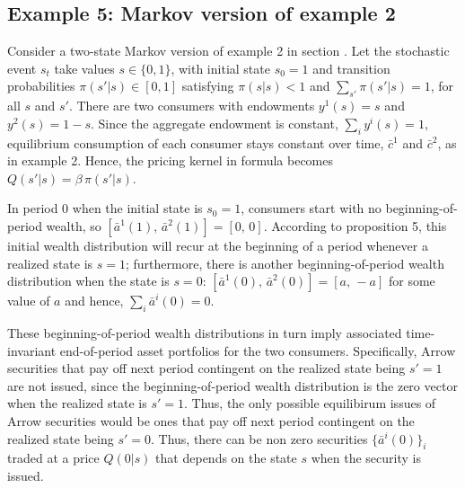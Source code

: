 \subsection{Example 5: Markov version of 
                           example 2}\label{sec:example5}%
Consider a two-state Markov version of example 2 in 
section .
Let the stochastic event $s_t$ take values 
$s\in\{0,1\}$, 
with initial state $s_0=1$ and transition 
probabilities $\pi(s'\vert s)\in [0,1]$
satisfying $\pi(s|s)<1$ and $\sum_{s'} \pi(s'\vert s)=1$,
for all $s$ and $s'$.
There are two consumers with endowments $y^1(s)=s$ and 
$y^2(s)=1-s$. Since the aggregate endowment is constant,
$\sum_i y^i(s)=1$, equilibrium consumption of each
consumer stays constant over time, 
$\bar c^1$ and $\bar c^2$, as in example 2. Hence, 
the pricing kernel in formula  becomes
$Q(s'|s) = \beta \,\pi(s'|s)$.

In period 0 when the initial state is $s_0=1$,  
consumers start with no beginning-of-period wealth, so 
$[\bar a^1(1),\, \bar a^2(1)] = [0,\, 0]$.
According to proposition 5, this initial wealth
distribution will recur  at the beginning of
a period whenever a realized state is $s=1$;  furthermore, 
there is another beginning-of-period wealth
distribution when the state is $s=0$:
$[\bar a^1(0),\, \bar a^2(0)] = [a,\, -\!a]$ 
for some value of $a$ and hence,
$\sum_{i} \bar a^i(0) =0$.

These beginning-of-period wealth distributions in
turn imply associated time-invariant end-of-period 
asset portfolios for  the two consumers. 
Specifically,  Arrow
securities that pay off next period contingent on 
the realized state being $s'=1$ are not  issued, since the 
beginning-of-period wealth distribution is the 
zero vector when the realized state is $s'=1$.
Thus, the only possible equilibirum issues of Arrow
securities would be ones that pay off next period
contingent on the realized state being $s'=0$. Thus, there can be non zero
securities $\{\bar a^i(0)\}_i$ traded  at a price 
$Q(0 | s)$ that depends on the 
state $s$ when the security is issued.

